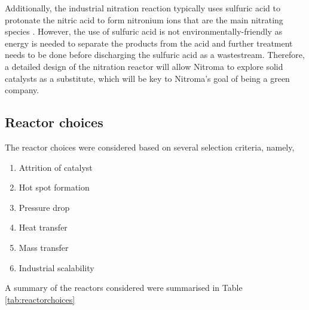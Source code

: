 Additionally, the industrial nitration reaction typically uses sulfuric acid to protonate the nitric acid to form nitronium ions that are the main nitrating species \cite{sreedhar_scientific_2013}. However, the use of sulfuric acid is not environmentally-friendly as energy is needed to separate the products from the acid and further treatment needs to be done before discharging the sulfuric acid as a wastestream. Therefore, a detailed design of the nitration reactor will allow Nitroma to explore solid catalysts as a substitute, which will be key to Nitroma's goal of being a green company.  

\subsection{Reactor choices}
The reactor choices were considered based on several selection criteria, namely,
\begin{enumerate}
    \item Attrition of catalyst
    \item Hot spot formation
    \item Pressure drop
    \item Heat transfer
    \item Mass transfer
    \item Industrial scalability
\end{enumerate}
A summary of the reactors considered were summarised in Table \ref{tab:reactorchoices}
